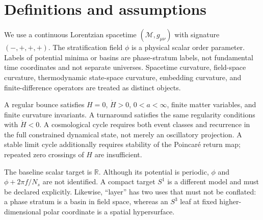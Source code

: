 \section{Definitions and assumptions}
We use a continuous Lorentzian spacetime $(\mathcal M,g_{\mu\nu})$ with signature $(-,+,+,+)$. The stratification field $\phi$ is a physical scalar order parameter. Labels of potential minima or basins are phase-stratum labels, not fundamental time coordinates and not separate universes. Spacetime curvature, field-space curvature, thermodynamic state-space curvature, embedding curvature, and finite-difference operators are treated as distinct objects.

A regular bounce satisfies $H=0$, $\dot H>0$, $0<a<\infty$, finite matter variables, and finite curvature invariants. A turnaround satisfies the same regularity conditions with $\dot H<0$. A cosmological cycle requires both event classes and recurrence in the full constrained dynamical state, not merely an oscillatory projection. A stable limit cycle additionally requires stability of the Poincar\'e return map; repeated zero crossings of $H$ are insufficient.

The baseline scalar target is $\mathbb R$. Although its potential is periodic, $\phi$ and $\phi+2\pi f/N_s$ are not identified. A compact target $S^1$ is a different model and must be declared explicitly. Likewise, ``layer'' has two uses that must not be conflated: a phase stratum is a basin in field space, whereas an $S^3$ leaf at fixed higher-dimensional polar coordinate is a spatial hypersurface.
